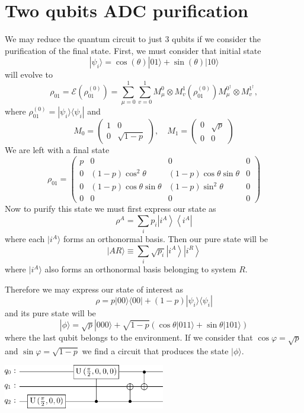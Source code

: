\documentclass[a4paper, onecolumn]{article}
\begin{document}
	\section{Two qubits ADC purification}
		We may reduce the quantum circuit to just 3 qubits if we consider the purification of the final state. First, we must consider that initial state
		$$
			|\psi_i\rangle=\cos(\theta)|01\rangle + \sin(\theta)|10\rangle
		$$
		will evolve to
		$$
		\rho_{01}=\mathcal{E}\left(\rho_{01}^{(0)}\right)=\sum_{\mu=0}^1 \sum_{v=0}^1 M_\mu^0 \otimes M_v^1\left(\rho_{01}^{(0)}\right) M_\mu^{0^{\dagger}} \otimes M_v^{1^{\dagger}},
		$$
		where $\rho_{01}^{(0)} = |\psi_i\rangle\langle\psi_i|$ and
		$$
		M_0=\left(\begin{array}{cc}
		1 & 0 \\
		0 & \sqrt{1-p}
		\end{array}\right), \quad M_1=\left(\begin{array}{cc}
		0 & \sqrt{p} \\
		0 & 0
		\end{array}\right)
		$$
		We are left with a final state
		$$
		\rho_{01}=\left(\begin{array}{cccc}
		p & 0 & 0 & 0 \\
		0 & (1-p) \cos ^2 \theta & (1-p) \cos \theta \sin \theta & 0 \\
		0 & (1-p) \cos \theta \sin \theta & (1-p) \sin ^2 \theta & 0 \\
		0 & 0 & 0 & 0
		\end{array}\right)
		$$
		Now to purify this state \cite{nielsen_quantum_2010} we must first express our state as
		$$
		\rho^A=\sum_i p_i\left|i^A\right\rangle\left\langle i^A\right|
		$$
		where each $|i^A\rangle$ forms an orthonormal basis. Then our pure state will be
		$$
		|A R\rangle \equiv \sum_i \sqrt{p_i}\left|i^A\right\rangle\left|i^R\right\rangle
		$$
		where $|i^A\rangle$ also forms an orthonormal basis belonging to system $R$.

		Therefore we may express our state of interest as
		$$
		\rho=p|00\rangle\langle 00|+(1-p)| \psi_i\rangle\langle\psi_i|
		$$
		and its pure state will be
		$$
		|\phi\rangle=\sqrt{p}|000\rangle+\sqrt{1-p}(\cos \theta|011\rangle+\sin \theta|101\rangle)
		$$
		where the last qubit belongs to the environment. If we consider that $\cos\varphi=\sqrt{p}$ and $\sin\varphi=\sqrt{1-p}$ we find a circuit that produces the state $|\phi\rangle$.

		\begin{center}
			\includegraphics[width=200pt]{img/adc_2q_v1.png}
			\label{adc_2q_v1}
		\end{center}
\end{document}
